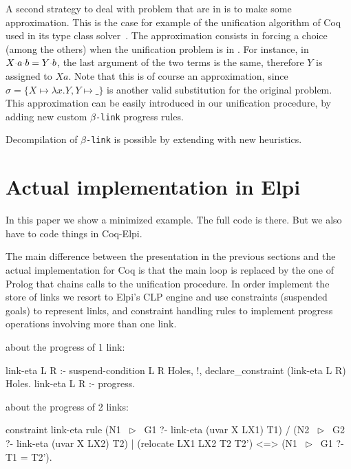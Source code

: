 \documentclass[sigconf,natbib=false,review]{acmart}
\newcommand{\appsep}{\ensuremath{\textcolor{lightgray}{\cdot}}}
\newcommand{\linkMacro}[1]{\ensuremath{#1}\texttt{-link}\xspace}
\newcommand{\linkbeta}{\linkMacro{\beta}}
\begin{document}
A second strategy to deal with problem that are in \notllambda is to make some
approximation. This is the case for example of the unification algorithm of Coq
used in its type class solver~\cite{sozeau08}. The approximation consists in
forcing a choice (among the others) when the unification problem is in
\notllambda. For instance, in $X \appsep a \appsep b = Y \appsep b$, the last
argument of the two terms is the same, therefore $Y$ is assigned to $X a$. Note
that this is of course an approximation, since $\sigma = \{X \mapsto \lambda x.Y, Y \mapsto
\_\}$ is another valid substitution for the original problem. This approximation
can be easily introduced in our unification procedure, by adding new custom 
\linkbeta progress rules.

Decompilation of \linkbeta is possible by extending  with
new heuristics.


\section{Actual implementation in Elpi}\label{sec:implementation}

In this paper we show a minimized example. The full code is there.
But we also have to code things in Coq-Elpi.

The main difference between the presentation in the previous sections and
the actual implementation for Coq is that the main loop \hrun is replaced by
the one of Prolog that chains calls to the unification procedure. In order
implement the store of links we resort to Elpi's CLP engine and
use constraints (suspended goals) to represent links, and constraint
handling rules to implement progress operations involving more than one link.

about the progress of 1 link:

\begin{elpicode}
link-eta L R :- suspend-condition L R Holes, !,
  declare_constraint (link-eta L R) Holes.
link-eta L R :-
  progress. %
\end{elpicode}

about the progress of 2 links:

\begin{elpicode}
constraint link-eta {
  rule (N1 ~$\triangleright$~ G1 ?- link-eta (uvar X LX1) T1) %
    /  (N2 ~$\triangleright$~ G2 ?- link-eta (uvar X LX2) T2) %
    |  (relocate LX1 LX2 T2 T2')             %
   <=> (N1 ~$\triangleright$~ G1 ?- T1 = T2').                %
}
\end{elpicode}
\end{document}
